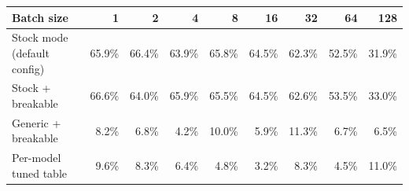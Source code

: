 \begin{tabular}{lrrrrrrrr}
\toprule
Batch size & 1 & 2 & 4 & 8 & 16 & 32 & 64 & 128 \\
\midrule
Stock mode (default config) & 65.9\% & 66.4\% & 63.9\% & 65.8\% & 64.5\% & 62.3\% & 52.5\% & 31.9\% \\
Stock + breakable & 66.6\% & 64.0\% & 65.9\% & 65.5\% & 64.5\% & 62.6\% & 53.5\% & 33.0\% \\
Generic + breakable & 8.2\% & 6.8\% & 4.2\% & 10.0\% & 5.9\% & 11.3\% & 6.7\% & 6.5\% \\
Per-model tuned table & 9.6\% & 8.3\% & 6.4\% & 4.8\% & 3.2\% & 8.3\% & 4.5\% & 11.0\% \\
\bottomrule
\end{tabular}
